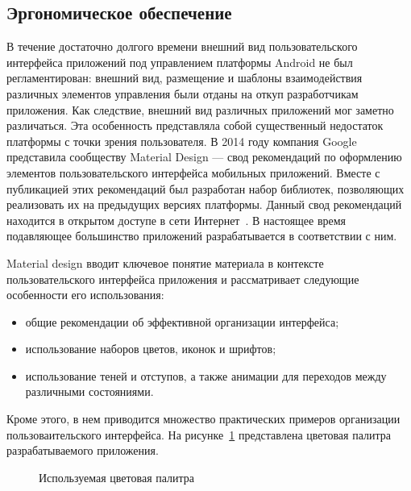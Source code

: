 \subsection{Эргономическое обеспечение}

В течение достаточно долгого времени внешний вид пользовательского интерфейса
приложений под управлением платформы Android не был регламентирован:
внешний вид, размещение и шаблоны взаимодействия различных элементов управления
были отданы на откуп разработчикам приложения.
Как следствие, внешний вид различных приложений мог заметно различаться.
Эта особенность представляла собой существенный недостаток платформы
с точки зрения пользователя.
В 2014 году компания Google представила сообществу Material Design ---
свод рекомендаций по оформлению элементов пользовательского интерфейса
мобильных приложений. Вместе с публикацией этих рекомендаций был
разработан набор библиотек, позволяющих реализовать их на предыдущих версиях платформы.
Данный свод рекомендаций находится в открытом доступе в сети
Интернет~\cite{material_design}.
В настоящее время подавляющее большинство приложений разрабатывается
в соответствии с ним.

Material design вводит ключевое понятие материала в контексте
пользовательского интерфейса приложения и рассматривает следующие
особенности его использования:
\begin{itemize}
\item общие рекомендации об эффективной организации интерфейса;
\item использование наборов цветов, иконок и шрифтов;
\item использование теней и отступов,
  а также анимации для переходов между различными состояниями.
\end{itemize}

Кроме этого, в нем приводится множество практических примеров
организации пользоваительского интерфейса.
На рисунке~\ref{fig:design_colors} представлена цветовая палитра
разрабатываемого приложения.

\begin{figure}[h!]
  \centering
  \caption{Используемая цветовая палитра}
  \label{fig:design_colors}
\end{figure}


